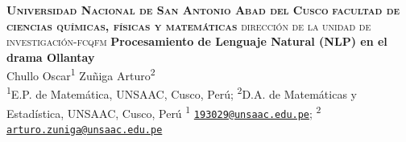 \documentclass[article,30pt,extrafontsizes]{memoir}
\begin{document}
\begin{topbox}
  \color{titletextcol}
  \vspace{0.5in}
  \LARGE{\textsc{\textbf{Universidad Nacional de San Antonio Abad del Cusco}}
\break \textsc{\textbf{facultad de ciencias químicas, físicas y matemáticas}}
\break \textsc{dirección de la unidad de investigación-fcqfm}
\break \textbf{Procesamiento de Lenguaje Natural (NLP) en el drama Ollantay}}  \\[0.3in]  %
  \color{authortextcol} \Large{Chullo Oscar\textsuperscript{1} Zuñiga
Arturo\textsuperscript{2}} \\[0.2in] %
  \color{affiliationtextcol} \large{\textsuperscript{1}E.P. de
Matemática, UNSAAC, Cusco, Perú; \textsuperscript{2}D.A. de Matemáticas y Estadística, UNSAAC, Cusco, Perú \break \textsuperscript{1}
\href{mailto:193029@unsaac.edu.pe}{\nolinkurl{193029@unsaac.edu.pe}};
\textsuperscript{2}
\href{mailto:arturo.zuniga@unsaac.edu.pe}{\nolinkurl{arturo.zuniga@unsaac.edu.pe}}} %
  \vspace{1cm}
\end{topbox}
\sloppy 
\end{document}
